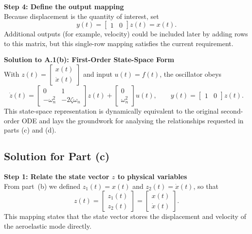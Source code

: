 \documentclass[12pt]{article}
\begin{document}
\begin{stepbox}
\textbf{Step 4: Define the output mapping}\\[0.5em]
Because displacement is the quantity of interest, set
\[
y(t) = \begin{bmatrix} 1 & 0 \end{bmatrix} z(t) = x(t).
\]
Additional outputs (for example, velocity) could be included later by adding rows to this matrix, but this single-row mapping satisfies the current requirement.
\end{stepbox}

\begin{resultsbox}
\textbf{Solution to A.1(b): First-Order State-Space Form}\\[0.5em]
With $z(t) = \begin{bmatrix} x(t) \\ \dot{x}(t) \end{bmatrix}$ and input $u(t) = f(t)$, the oscillator obeys
\[
\dot{z}(t) =
\begin{bmatrix}
0 & 1 \\
-\omega_n^2 & -2\zeta\omega_n
\end{bmatrix} z(t) +
\begin{bmatrix}
0 \\
\omega_n^2
\end{bmatrix} u(t),
\qquad
y(t) = \begin{bmatrix} 1 & 0 \end{bmatrix} z(t).
\]
This state-space representation is dynamically equivalent to the original second-order ODE and lays the groundwork for analysing the relationships requested in parts (c) and (d).
\end{resultsbox}

\clearpage
\clearpage
\subsection*{Solution for Part (c)}

\begin{stepbox}
\textbf{Step 1: Relate the state vector $z$ to physical variables}\\[0.5em]
From part~(b) we defined $z_1(t) = x(t)$ and $z_2(t) = \dot{x}(t)$, so that
\[
z(t) = \begin{bmatrix} z_1(t) \\ z_2(t) \end{bmatrix} = \begin{bmatrix} x(t) \\ \dot{x}(t) \end{bmatrix}.
\]
This mapping states that the state vector stores the displacement and velocity of the aeroelastic mode directly.
\end{stepbox}
\end{document}
